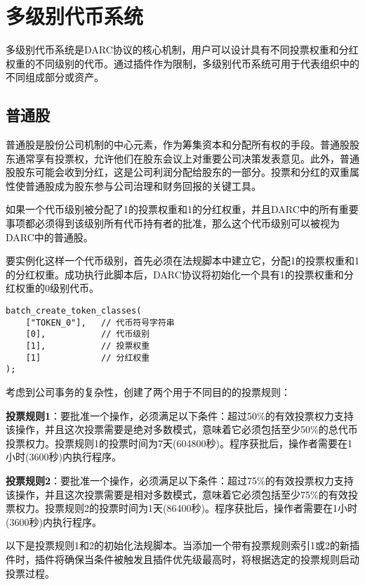\documentclass[main.tex]{subfiles}
\begin{document}
\section{多级别代币系统}

多级别代币系统是DARC协议的核心机制，用户可以设计具有不同投票权重和分红权重的不同级别的代币。通过插件作为限制，多级别代币系统可用于代表组织中的不同组成部分或资产。

\subsection{普通股}

普通股是股份公司机制的中心元素，作为筹集资本和分配所有权的手段。普通股股东通常享有投票权，允许他们在股东会议上对重要公司决策发表意见。此外，普通股股东可能会收到分红，这是公司利润分配给股东的一部分。投票和分红的双重属性使普通股成为股东参与公司治理和财务回报的关键工具。

如果一个代币级别被分配了1的投票权重和1的分红权重，并且DARC中的所有重要事项都必须得到该级别所有代币持有者的批准，那么这个代币级别可以被视为DARC中的普通股。

要实例化这样一个代币级别，首先必须在法规脚本中建立它，分配1的投票权重和1的分红权重。成功执行此脚本后，DARC协议将初始化一个具有1的投票权重和分红权重的0级别代币。

\begin{verbatim}
batch_create_token_classes(
    ["TOKEN_0"],   // 代币符号字符串
    [0],           // 代币级别
    [1],           // 投票权重
    [1]            // 分红权重
);
\end{verbatim}

考虑到公司事务的复杂性，创建了两个用于不同目的的投票规则：

\textbf{投票规则1}：要批准一个操作，必须满足以下条件：超过50\%的有效投票权力支持该操作，并且这次投票需要是绝对多数模式，意味着它必须包括至少50\%的总代币投票权力。投票规则1的投票时间为7天(604800秒)。程序获批后，操作者需要在1小时(3600秒)内执行程序。

\textbf{投票规则2}：要批准一个操作，必须满足以下条件：超过75\%的有效投票权力支持该操作，并且这次投票需要是相对多数模式，意味着它必须包括至少75\%的有效投票权力。投票规则2的投票时间为1天(86400秒)。程序获批后，操作者需要在1小时(3600秒)内执行程序。

以下是投票规则1和2的初始化法规脚本。当添加一个带有投票规则索引1或2的新插件时，插件将确保当条件被触发且插件优先级最高时，将根据选定的投票规则启动投票过程。
\end{document}
